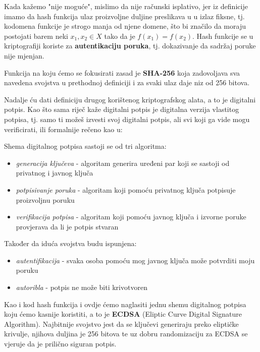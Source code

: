 \documentclass[12pt]{report}
\begin{document}
Kada kažemo "nije moguće", mislimo da nije računski isplativo, jer iz definicije imamo da hash funkcija ulaz proizvoljne duljine preslikava u u izlaz fiksne, tj. kodomena funkcije je strogo manja od njene domene, što bi značilo da moraju postojati barem neki $x_{1}, x_{2} \in X$ tako da je $f(x_{1}) = f(x_{2})$. Hash funkcije se u kriptografiji koriste za \textbf{autentikaciju poruka}, tj. dokazivanje da sadržaj poruke nije mjenjan. 

Funkcija na koju ćemo se fokusirati zasad je \textbf{SHA-256} koja zadovoljava sva navedena svojstva u prethodnoj definiciji i za svaki ulaz daje niz od 256 bitova.

Nadalje ću dati definiciju drugog korištenog kriptografskog alata, a to je digitalni potpis. Kao što sama riječ kaže digitalni potpis je digitalna verzija vlastitog potpisa, tj. samo ti možeš izvesti svoj digitalni potpis, ali svi koji ga vide mogu verificirati, ili formalnije rečeno kao u\cite{bitcoincrypto}:

\begin{definicija}
Shema digitalnog potpisa sastoji se od tri algoritma: 
\begin{itemize}
    \item \textit{generacija ključeva} - algoritam generira uređeni par koji se sastoji od privatnog i javnog ključa
    \item \textit{potpisivanje poruka} - algoritam koji pomoću privatnog ključa potpisuje proizvoljnu poruku
    \item \textit{verifikacija potpisa} - algoritam koji pomoću javnog ključa i izvorne poruke provjerava da li je potpis stvaran
\end{itemize}
Također da iduća svojstva budu ispunjena:
\begin{itemize}
    \item \textit{autentifikacija} - svaka osoba pomoću mog javnog ključa može potvrditi moju poruku
    \item \textit{autoribla} - potpis ne može biti krivotvoren
\end{itemize}
\end{definicija}

Kao i kod hash funkcija i ovdje ćemo naglasiti jednu shemu digitalnog potpisa koju ćemo kasnije koristiti, a to je \textbf{ECDSA} (Eliptic Curve Digital Signature Algorithm). Najbitnije svojstvo jest da se ključevi generiraju preko eliptičke krivulje, njihova duljina je 256 bitova te uz dobru randomizaciju za ECDSA se vjeruje da je prilično siguran potpis.
\end{document}
